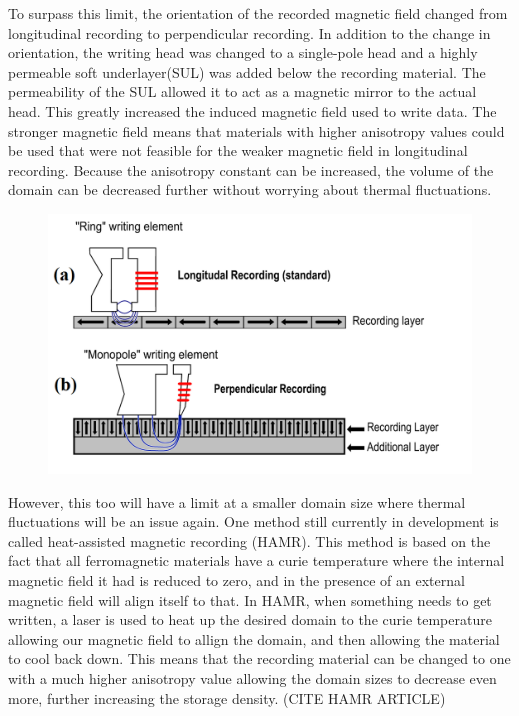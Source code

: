 \documentclass[ aip, 12pt]{revtex4-1} %
\begin{document}
To surpass this limit, the orientation of the recorded magnetic field changed from longitudinal recording to perpendicular recording. In addition to the change in orientation, the writing head was changed to a single-pole head and a highly permeable soft underlayer(SUL) was added below the recording material. The permeability of the SUL allowed it to act as a magnetic mirror to the actual head. This greatly increased the induced magnetic field used to write data. The stronger magnetic field means that materials with higher anisotropy values could be used that were not feasible for the weaker magnetic field in longitudinal recording. Because the anisotropy constant can be increased, the volume of the domain can be decreased further without worrying about thermal fluctuations.

\begin{figure}[H]
\centerline{\includegraphics[scale=.45]{perpendicularComparison.png}}
\caption{ }
\label{perpendicularComparison}
\end{figure}


However, this too will have a limit at a smaller domain size where thermal fluctuations will be an issue again. One method still currently in development is called heat-assisted magnetic recording (HAMR). This method is based on the fact that all ferromagnetic materials have a curie temperature where the internal magnetic field it had is reduced to zero, and in the presence of an external magnetic field will align itself to that. In HAMR, when something needs to get written, a laser is used to heat up the desired domain to the curie temperature allowing our magnetic field to allign the domain, and then allowing the material to cool back down. This means that the recording material can be changed to one with a much higher anisotropy value allowing the domain sizes to decrease even more, further increasing the storage density. (CITE HAMR ARTICLE)
\end{document}
